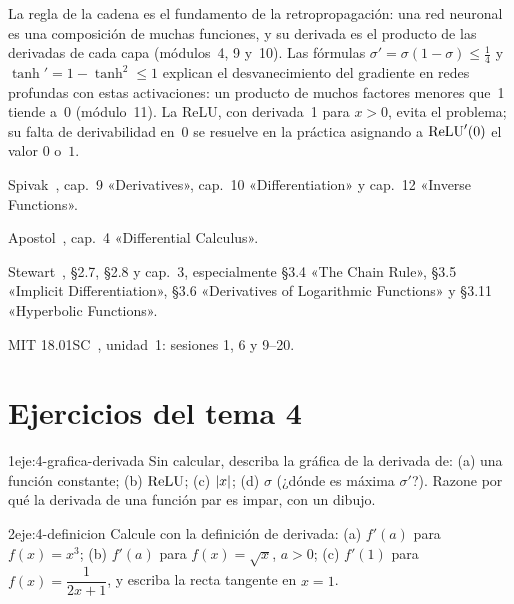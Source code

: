 \begin{observacion}
La regla de la cadena es el fundamento de la retropropagación: una red neuronal es una composición de muchas funciones, y su derivada es el producto de las derivadas de cada capa (módulos~4, 9 y~10). Las fórmulas $\sigma'=\sigma(1-\sigma)\le\tfrac14$ y $\tanh'=1-\tanh^{2}\le1$ explican el desvanecimiento del gradiente en redes profundas con estas activaciones: un producto de muchos factores menores que~1 tiende a~0 (módulo~11). La ReLU, con derivada~1 para $x>0$, evita el problema; su falta de derivabilidad en~0 se resuelve en la práctica asignando a $\operatorname{ReLU}'(0)$ el valor $0$ o~$1$.
\end{observacion}

\begin{lecturas}
\item Spivak~\cite{spivak}, cap.~9 «Derivatives», cap.~10 «Differentiation» y cap.~12 «Inverse Functions».
\item Apostol~\cite{apostol}, cap.~4 «Differential Calculus».
\item Stewart~\cite{stewart}, §2.7, §2.8 y cap.~3, especialmente §3.4 «The Chain Rule», §3.5 «Implicit Differentiation», §3.6 «Derivatives of Logarithmic Functions» y §3.11 «Hyperbolic Functions».
\item MIT 18.01SC~\cite{mit1801}, unidad~1: sesiones 1, 6 y 9--20.
\end{lecturas}

\section*{Ejercicios del tema 4}

\begin{ejercicio}{1}{eje:4-grafica-derivada}
Sin calcular, describa la gráfica de la derivada de: (a) una función constante; (b) $\operatorname{ReLU}$; (c) $\lvert x\rvert$; (d) $\sigma$ (¿dónde es máxima $\sigma'$?). Razone por qué la derivada de una función par es impar, con un dibujo.
\end{ejercicio}

\begin{ejercicio}{2}{eje:4-definicion}
Calcule con la definición de derivada: (a) $f'(a)$ para $f(x)=x^{3}$; (b) $f'(a)$ para $f(x)=\sqrt{x}$, $a>0$; (c) $f'(1)$ para $f(x)=\dfrac{1}{2x+1}$, y escriba la recta tangente en $x=1$.
\end{ejercicio}

